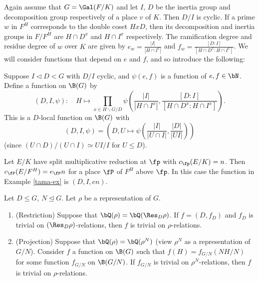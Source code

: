 Again assume that $G = \Gal(F / K)$ and let $I$, $D$ be the inertia group and decomposition group respectively of a place $v$ of $K$.  Then $D / I$ is cyclic. If a prime $w$ in $F^H$ corresponds to the double coset $HxD$, then its decomposition and inertia groups in $F / F^H$ are $H \cap D^x$ and $H \cap I^x$ respectively.
The ramification degree and residue degree of $w$ over $K$ are given by $e_w = \frac{|I|}{|H \cap I^x|}$ and $f_w = \frac{[D : I]}{[H \cap D^x : H \cap I^x]}$. We will consider functions that depend on $e$ and $f$, and so introduce the following:

\begin{defn}\cite[Definition 2.35]{reg-const}\label{D-I-fn}
    Suppose $I \triangleleft D < G$ with $D / I$ cyclic, and $\psi(e,f)$ is a function of $e, f \in \bN$. Define a function on $\B(G)$ by 
    \[ \left(D, I, \psi\right) \colon \quad H \mapsto \prod_{x \in H\backslash G / D} \psi\left(\frac{|I|}{|H \cap I^x|}, \frac{[D : I]}{[H \cap D^x : H \cap I^x]}\right). \]
    This is a $D$-local function on $\B(G)$ with
    \[ (D, I, \psi) = \left(D, U \mapsto \psi\left(\frac{|I|}{|U \cap I|}, \frac{|D|}{|UI|}\right)\right) \]
    (since $(U \cap D) / (U \cap I) \simeq UI / I$ for $U \leq D$).
\end{defn}

\begin{example}
    Let $E / K$ have split multiplicative reduction at $\fp$ with $c_{\fp}(E / K) = n$. Then $c_{\fP}(E / F^H) = e_{\fP} n$ for a place $\fP$ of $F^H$ above $\fp$. In this case the function in Example \ref{tama-ex} is $(D, I, e n)$. 
\end{example}


\begin{prop}
    Let $D \leq G$, $N \trianglelefteq G$. Let $\rho$ be a representation of $G$.
    \begin{enumerate}
        \item (Restriction) Suppose that $\bQ(\rho) = \bQ(\Res_D \rho)$. If $f = (D, f_D)$ and $f_D$ is trivial on $(\Res_D \rho)$-relations, then $f$ is trivial on $\rho$-relations.
        \item (Projection) Suppose that $\bQ(\rho) = \bQ(\rho^N)$ (view $\rho^N$ as a representation of $G / N$). Consider $f$ a function on $\B(G)$ such that $f(H) = f_{G / N}(N H / N)$ for some function $f_{G / N}$ on $\B(G / N)$. If $f_{G / N}$ is trivial on $\rho^N$-relations, then $f$ is trivial on $\rho$-relations.
    \end{enumerate}
\end{prop}

